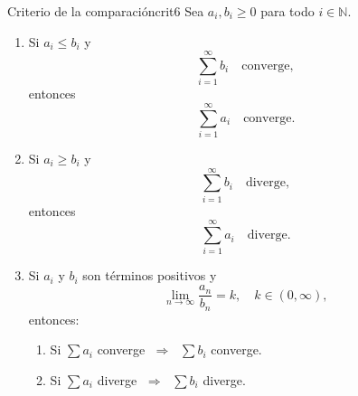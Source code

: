 \begin{teorema}{Criterio de la comparación}{crit6}
    Sea $a_i, b_i \geq 0$ para todo $i \in \mathbb{N}$.
    \begin{enumerate}
        \item Si $a_i \leq b_i$ y 
        \[
            \sum_{i=1}^{\infty} b_i \quad \text{converge},
        \]
        entonces 
        \[
            \sum_{i=1}^{\infty} a_i \quad \text{converge}.
        \]

        \item Si $a_i \geq b_i$ y 
        \[
            \sum_{i=1}^{\infty} b_i \quad \text{diverge},
        \]
        entonces 
        \[
            \sum_{i=1}^{\infty} a_i \quad \text{diverge}.
        \]

        \item Si $a_i$ y $b_i$ son términos positivos y 
        \[
            \lim_{n \to \infty} \frac{a_n}{b_n} = k, \quad k \in (0,\infty),
        \]
        entonces:
        \begin{enumerate}
            \item Si $\sum a_i$ converge $\;\Rightarrow\;$ $\sum b_i$ converge.
            \item Si $\sum a_i$ diverge $\;\Rightarrow\;$ $\sum b_i$ diverge.
        \end{enumerate}
    \end{enumerate}
\end{teorema}

